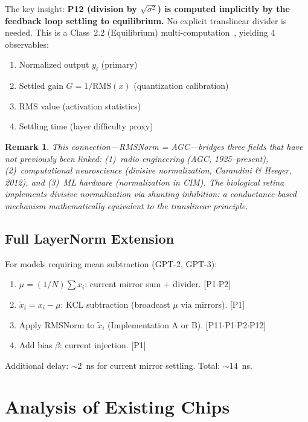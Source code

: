 \documentclass[11pt]{article}
\newtheorem{remark}{Remark}
\begin{document}
The key insight: \textbf{P12 (division by $\sqrt{\sigma^2}$) is computed implicitly by the feedback loop settling to equilibrium.} No explicit translinear divider is needed. This is a Class~2.2 (Equilibrium) multi-computation~\cite{bieg2026}, yielding 4 observables:
\begin{enumerate}
\item Normalized output $y_i$ (primary)
\item Settled gain $G = 1/\text{RMS}(x)$ (quantization calibration)
\item RMS value (activation statistics)
\item Settling time (layer difficulty proxy)
\end{enumerate}

\begin{remark}
This connection---RMSNorm = AGC---bridges three fields that have not previously been linked: (1)~radio engineering (AGC, 1925--present), (2)~computational neuroscience (divisive normalization, Carandini \& Heeger, 2012), and (3)~ML hardware (normalization in CIM). The biological retina implements divisive normalization via shunting inhibition: a conductance-based mechanism mathematically equivalent to the translinear principle.
\end{remark}

\subsection{Full LayerNorm Extension}

For models requiring mean subtraction (GPT-2, GPT-3):
\begin{enumerate}[leftmargin=*]
\item $\mu = (1/N)\sum x_i$: current mirror sum + divider. \hfill [P1$\cdot$P2]
\item $\tilde{x}_i = x_i - \mu$: KCL subtraction (broadcast $\mu$ via mirrors). \hfill [P1]
\item Apply RMSNorm to $\tilde{x}_i$ (Implementation A or B). \hfill [P11$\cdot$P1$\cdot$P2$\cdot$P12]
\item Add bias $\beta$: current injection. \hfill [P1]
\end{enumerate}

Additional delay: ${\sim}2$~ns for current mirror settling. Total: ${\sim}14$~ns.

\section{Analysis of Existing Chips}
\label{sec:analysis}
\end{document}
